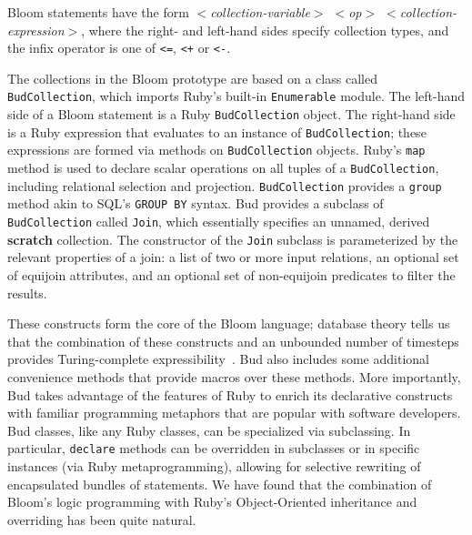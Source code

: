 Bloom statements have the form \emph {$<$collection-variable$>$ $<$op$>$ $<$collection-expression$>$}, where the right- and left-hand sides specify collection types, and the infix operator is one of \texttt{<=}, \texttt{<+} or \texttt{<-}.

The collections in the Bloom prototype are based on a class called \texttt{BudCollection}, which imports Ruby's built-in \texttt{Enumerable} module.  The left-hand side of a Bloom statement is a Ruby  \texttt{BudCollection} object. The right-hand side is a Ruby expression that evaluates to an instance of \texttt{BudCollection}; these expressions are formed via methods on \texttt{BudCollection} objects.  Ruby's \texttt{map} method is used to declare scalar operations on all tuples of a \texttt{BudCollection}, including relational selection and projection.      \texttt{BudCollection} provides a \texttt{group} method akin to SQL's \texttt{GROUP BY} syntax.         Bud provides a subclass of \texttt{BudCollection} called \texttt{Join}, which essentially specifies an unnamed, derived {\bf scratch} collection.  The constructor of the \texttt{Join} subclass is parameterized by the relevant properties of a join: a list of two or more input relations, an optional set of equijoin attributes, and an optional set of non-equijoin predicates to filter the results.  


These constructs form the core of the Bloom language; database theory tells us that the combination of these constructs and an unbounded number of timesteps provides Turing-complete expressibility~\cite{christospaper}.  Bud also includes some additional convenience methods that provide macros over these methods.  More importantly, Bud takes advantage of the features of Ruby to enrich its declarative constructs with familiar programming metaphors that are popular with software developers.  Bud classes, like any Ruby classes, can be specialized via subclassing.  In particular, \texttt{declare} methods can be overridden in subclasses or in specific instances (via Ruby metaprogramming), allowing for selective rewriting of encapsulated bundles of statements.  We have found that the combination of Bloom's logic programming with Ruby's Object-Oriented inheritance and overriding has been quite natural.

